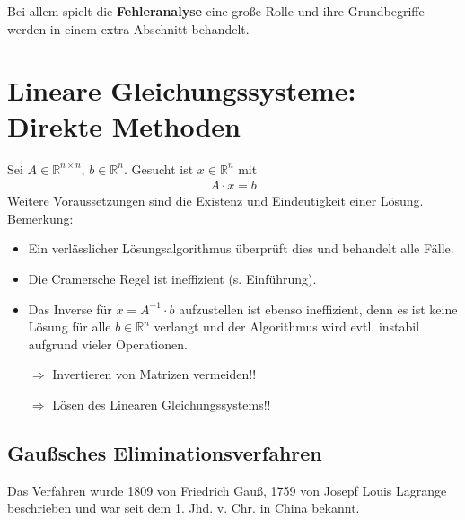 \documentclass[ngerman,fontsize=11pt, paper=a4, parskip=half, titlepage=true, toc=bib]{scrbook}
\newcommand{\R}{\mathds{R}}
\newcommand{\sectione}[1]{\section{#1} \setcounter{equation}{0}}
\begin{document}
Bei allem spielt die \textbf{Fehleranalyse} eine große Rolle und
ihre Grundbegriffe werden in einem extra Abschnitt behandelt.


\chapter{Lineare Gleichungssysteme: Direkte Methoden}
Sei $ A \in \R^{n\times n}$, $b \in \R^n$. Gesucht ist $x\in \R^n$ mit 
\begin{gather*}
  A\cdot x = b
\end{gather*}
Weitere Voraussetzungen sind die Existenz und Eindeutigkeit einer Lösung.
Bemerkung:
\begin{itemize}
\item Ein verlässlicher Lösungsalgorithmus überprüft dies und behandelt alle Fälle. 
\item Die Cramersche Regel ist ineffizient (s. Einführung).
\item Das Inverse für $x=A^{-1}\cdot b$ aufzustellen ist ebenso ineffizient,
         denn es ist keine Lösung für alle $b\in \R^n$ verlangt
         und der Algorithmus wird evtl. instabil aufgrund vieler Operationen.
\item [$\Rightarrow$] Invertieren von Matrizen vermeiden!!
\item [$\Rightarrow$] Lösen des Linearen Gleichungssystems!!
\end{itemize}

\sectione{Gaußsches Eliminationsverfahren} \label{2.2.1}
Das Verfahren wurde 1809 von Friedrich Gauß,
1759 von Josepf Louis Lagrange beschrieben
und war seit dem 1. Jhd. v. Chr. in China bekannt.
\end{document}
